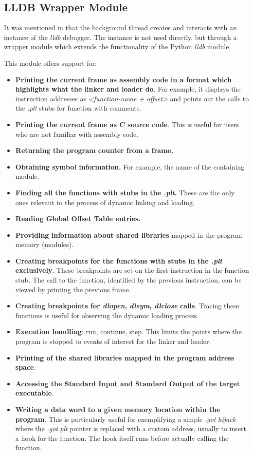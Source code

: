 \subsection{LLDB Wrapper Module}
\label{sub-sec:lldb-wrap-implem}

It was mentioned in  that the background thread creates and interacts with an instance of the \textit{lldb} debugger. The instance is not used directly, but through a wrapper module which extends the functionality of the Python \textit{lldb} module.

This module offers support for:
\begin{itemize}
\item \textbf{Printing the current frame as assembly code in a format which highlights what the linker and loader do}. For example, it displays the instruction addresses as \textit{<function-name + offset>} and points out the calls to the \textit{.plt} stubs for function with comments.
\item \textbf{Printing the current frame as C source code}. This is useful for users who are not familiar with assembly code.
\item \textbf{Returning the program counter from a frame.}
\item \textbf{Obtaining symbol information.} For example, the name of the containing module.
\item \textbf{Finding all the functions with stubs in the \textit{.plt}.} These are the only ones relevant to the process of dynamic linking and loading.
\item \textbf{Reading Global Offset Table entries.}
\item \textbf{Providing information about shared libraries} mapped in the program memory (modules).
\item \textbf{Creating breakpoints for the functions with stubs in the \textit{.plt} exclusively}. These breakpoints are set on the first instruction in the function stub. The call to the function, identified by the previous instruction, can be viewed by printing the previous frame.
\item \textbf{Creating breakpoints for \textit{dlopen}, \textit{dlsym}, \textit{dlclose} calls}. Tracing these functions is useful for observing the dynamic loading process.
\item \textbf{Execution handling}: run, continue, step. This limits the points where the program is stopped to events of interest for the linker and loader.
\item \textbf{Printing of the shared libraries mapped in the program address space}.
\item \textbf{Accessing the Standard Input and Standard Output of the target executable}.
\item \textbf{Writing a data word to a given memory location within the program}. This is particularly useful for exemplifying a simple \textit{.got hijack} where the \textit{.got.plt} pointer is replaced with a custom address, usually to insert a hook for the function. The hook itself runs before actually calling the function. 
\end{itemize}

